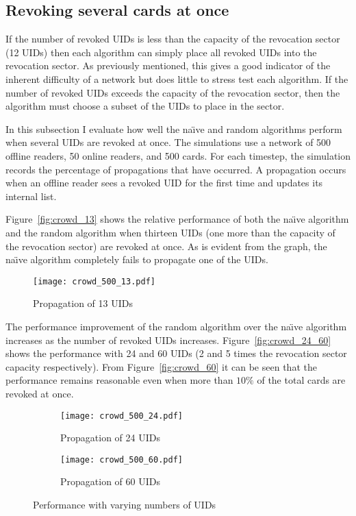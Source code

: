 \documentclass[dissertation.tex]{subfiles}
\begin{document}
  \subsection{Revoking several cards at once}

  If the number of revoked UIDs is less than the capacity of the revocation sector (12 UIDs) then each algorithm can simply place all revoked UIDs into the revocation sector. As previously mentioned, this gives a good indicator of the inherent difficulty of a network but does little to stress test each algorithm. If the number of revoked UIDs exceeds the capacity of the revocation sector, then the algorithm must choose a subset of the UIDs to place in the sector.

  In this subsection I evaluate how well the na\"{\i}ve and random algorithms perform when several UIDs are revoked at once. The simulations use a network of 500 offline readers, 50 online readers, and 500 cards. For each timestep, the simulation records the percentage of propagations that have occurred. A propagation occurs when an offline reader sees a revoked UID for the first time and updates its internal list.

  Figure~\vref{fig:crowd_13} shows the relative performance of both the na\"{\i}ve algorithm and the random algorithm when thirteen UIDs (one more than the capacity of the revocation sector) are revoked at once. As is evident from the graph, the na\"{\i}ve algorithm completely fails to propagate one of the UIDs.

  \begin{figure}[h]
    \centering
    \texttt{[image: crowd\_500\_13.pdf]}
    \caption{Propagation of 13 UIDs}\label{fig:crowd_13}
  \end{figure}

  The performance improvement of the random algorithm over the na\"{\i}ve algorithm increases as the number of revoked UIDs increases. Figure~\vref{fig:crowd_24_60} shows the performance with 24 and 60 UIDs (2 and 5 times the revocation sector capacity respectively). From Figure~\vref{fig:crowd_60} it can be seen that the performance remains reasonable even when more than $10\%$ of the total cards are revoked at once.

  \begin{figure}[h]
  \centering
  \begin{subfigure}{.5\textwidth}
    \centering
    \texttt{[image: crowd\_500\_24.pdf]}
    \caption{Propagation of 24 UIDs}\label{fig:crowd_24}
  \end{subfigure}%
  \begin{subfigure}{.5\textwidth}
    \centering
    \texttt{[image: crowd\_500\_60.pdf]}
    \caption{Propagation of 60 UIDs}\label{fig:crowd_60}
  \end{subfigure}
  \caption{Performance with varying numbers of UIDs}\label{fig:crowd_24_60}
  \end{figure}
\end{document}

